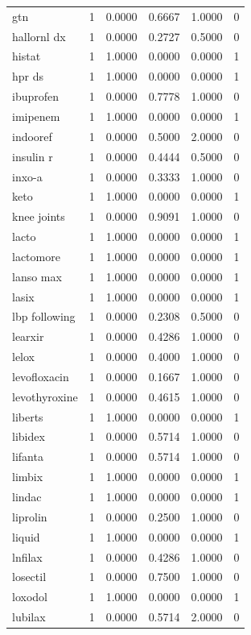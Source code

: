 \begin{longtable}{p{3.0cm}rrrrr}
gtn & 1 & 0.0000 & 0.6667 & 1.0000 & 0 \\
hallornl dx & 1 & 0.0000 & 0.2727 & 0.5000 & 0 \\
histat & 1 & 1.0000 & 0.0000 & 0.0000 & 1 \\
hpr ds & 1 & 1.0000 & 0.0000 & 0.0000 & 1 \\
ibuprofen & 1 & 0.0000 & 0.7778 & 1.0000 & 0 \\
imipenem & 1 & 1.0000 & 0.0000 & 0.0000 & 1 \\
indooref & 1 & 0.0000 & 0.5000 & 2.0000 & 0 \\
insulin r & 1 & 0.0000 & 0.4444 & 0.5000 & 0 \\
inxo-a & 1 & 0.0000 & 0.3333 & 1.0000 & 0 \\
keto & 1 & 1.0000 & 0.0000 & 0.0000 & 1 \\
knee joints & 1 & 0.0000 & 0.9091 & 1.0000 & 0 \\
lacto & 1 & 1.0000 & 0.0000 & 0.0000 & 1 \\
lactomore & 1 & 1.0000 & 0.0000 & 0.0000 & 1 \\
lanso max & 1 & 1.0000 & 0.0000 & 0.0000 & 1 \\
lasix & 1 & 1.0000 & 0.0000 & 0.0000 & 1 \\
lbp following & 1 & 0.0000 & 0.2308 & 0.5000 & 0 \\
learxir & 1 & 0.0000 & 0.4286 & 1.0000 & 0 \\
lelox & 1 & 0.0000 & 0.4000 & 1.0000 & 0 \\
levofloxacin & 1 & 0.0000 & 0.1667 & 1.0000 & 0 \\
levothyroxine & 1 & 0.0000 & 0.4615 & 1.0000 & 0 \\
liberts & 1 & 1.0000 & 0.0000 & 0.0000 & 1 \\
libidex & 1 & 0.0000 & 0.5714 & 1.0000 & 0 \\
lifanta & 1 & 0.0000 & 0.5714 & 1.0000 & 0 \\
limbix & 1 & 1.0000 & 0.0000 & 0.0000 & 1 \\
lindac & 1 & 1.0000 & 0.0000 & 0.0000 & 1 \\
liprolin & 1 & 0.0000 & 0.2500 & 1.0000 & 0 \\
liquid & 1 & 1.0000 & 0.0000 & 0.0000 & 1 \\
lnfilax & 1 & 0.0000 & 0.4286 & 1.0000 & 0 \\
losectil & 1 & 0.0000 & 0.7500 & 1.0000 & 0 \\
loxodol & 1 & 1.0000 & 0.0000 & 0.0000 & 1 \\
lubilax & 1 & 0.0000 & 0.5714 & 2.0000 & 0 \\

\end{longtable}
